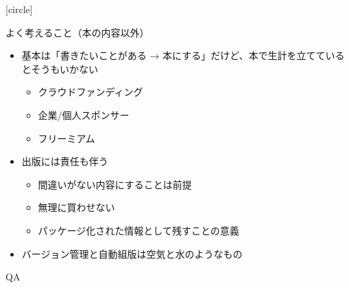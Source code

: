 \documentclass[13pt,dvipdfmx,uplatex]{beamer}
\def\tightlist{\sffamily}
\begin{document}
[circle]

\begin{frame}{よく考えること（本の内容以外）}
\protect\hypertarget{ux30b3ux30f3ux30c6ux30f3ux30c4ux306eux3053ux3068ux4ee5ux5916ux306bux3069ux3093ux306aux3053ux3068ux3092ux8003ux3048ux3066ux3044ux308bux304b}{}
\begin{itemize}
\tightlist
\item
  基本は「書きたいことがある →
  本にする」だけど、本で生計を立てているとそうもいかない

  \begin{itemize}
  \tightlist
  \item
    クラウドファンディング
  \item
    企業/個人スポンサー
  \item
    フリーミアム
  \end{itemize}
\item
  出版には責任も伴う

  \begin{itemize}
  \tightlist
  \item
    間違いがない内容にすることは前提
  \item
    無理に買わせない
  \item
    パッケージ化された情報として残すことの意義
  \end{itemize}
\item
  バージョン管理と自動組版は空気と水のようなもの
\end{itemize}
\end{frame}

\begin{frame}[plain]
  \begin{center}
    \color{kachi}\yasagoth
    QA
  \end{center}
\end{frame}
\end{document}
